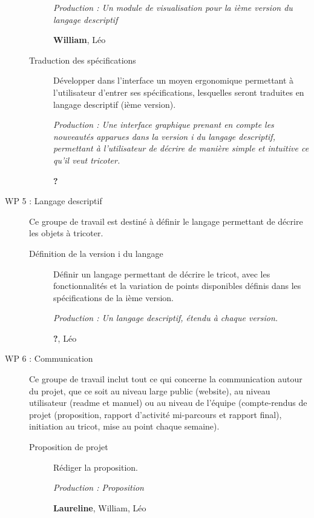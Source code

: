 \documentclass{article}
\begin{document}
\begin{description}
\begin{description}
    \textit{Production : Un module de visualisation pour la ième version du langage descriptif}

    \textbf{William}, Léo %

  \item[Traduction des spécifications] Développer dans l'interface un moyen ergonomique permettant à l'utilisateur d'entrer ses 
spécifications, lesquelles seront traduites en langage descriptif (ième version).

    \textit{Production : Une interface graphique prenant en compte les nouveautés apparues dans la version i du langage descriptif, 
permettant à l'utilisateur de décrire de manière simple et intuitive ce qu'il veut tricoter.}

    \textbf{?}
  \end{description}

\medskip

\item[WP 5 : Langage descriptif] Ce groupe de travail est destiné à définir le langage permettant de décrire les objets à tricoter.

  \begin{description}
  \item[Définition de la version i du langage] Définir un langage permettant de décrire le tricot, avec les fonctionnalités et la 
variation de points disponibles définis dans les spécifications de la ième version.

    \textit{Production : Un langage descriptif, étendu à chaque version.}

    \textbf{?}, Léo
  \end{description}

\medskip

\item[WP 6 : Communication] Ce groupe de travail inclut tout ce qui concerne la communication autour du projet, que ce soit au niveau 
large public (website), au niveau utilisateur (readme et manuel) ou au niveau de l'équipe (compte-rendus de projet (proposition, rapport 
d'activité mi-parcours et rapport final), initiation au tricot, mise au point chaque semaine).


  \begin{description}
  \item[Proposition de projet] Rédiger la proposition.

    \textit{Production : Proposition}

    \textbf{Laureline}, William, Léo


\end{description}
\end{description}
\end{document}
